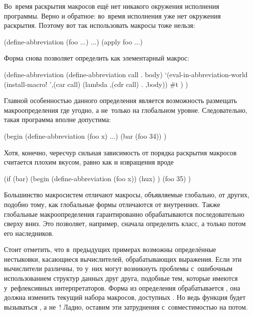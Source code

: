Во~время раскрытия макросов ещё нет никакого окружения исполнения программы.
Верно и обратное: во~время исполнения уже нет окружения раскрытия. Поэтому вот
так использовать макросы тоже нельзя:

\begin{code:lisp}
(define-abbreviation (foo ...) ...)
(apply foo ...)
\end{code:lisp}

Форма  снова позволяет определить
 как элементарный макрос:

\begin{code:lisp}
(define-abbreviation (define-abbreviation call . body)
  `(eval-in-abbreviation-world
     (install-macro! ',(car call) (lambda ,(cdr call) . ,body))
     #t ) )
\end{code:lisp}

Главной особенностью данного определения является возможность размещать
макроопределения где угодно, а не~только на глобальном уровне. Следовательно,
такая программа вполне допустима:

\begin{code:lisp}
(begin (define-abbreviation (foo x) ...)
       (bar (foo 34)) )
\end{code:lisp}

Хотя, конечно, чересчур сильная зависимость от порядка раскрытия макросов
считается плохим вкусом, равно как и извращения вроде

\begin{code:lisp}
(if (bar) (begin (define-abbreviation (foo x))
                 (hux) )
          (foo 35) )
\end{code:lisp}

Большинство макросистем отличают макросы, объявляемые глобально, от других,
подобно тому, как глобальные формы  отличаются от внутренних. Также
глобальные макроопределения гарантированно обрабатываются последовательно сверху
вниз. Это позволяет, например, сначала определить класс, а только потом его
наследников.

Стоит отметить, что в~предыдущих примерах возможны определённые нестыковки,
касающиеся вычислителей, обрабатывающих выражения. Если эти вычислители
различны, то у~них могут возникнуть проблемы с~ошибочным использованием
структур данных друг друга, подобные тем, которые имеются у~рефлексивных
интерпретаторов.  Форма  из
определения  обрабатывается , она
должна изменить текущий набора макросов, доступных . Но ведь
функция  будет вызываться , а не~!
Ладно, оставим эти затруднения с~совместимостью на потом.

